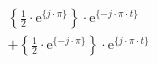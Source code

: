 \[
\begin{split}
&  \left \{ \frac{1}{2} \cdot \textrm{e}^{\{  j \cdot \pi \}} \right \} \cdot \textrm{e}^{\{- j \cdot \pi \cdot t \}}\\
&+ \left \{ \frac{1}{2} \cdot \textrm{e}^{\{ -j \cdot \pi \}} \right \} \cdot \textrm{e}^{\{  j \cdot \pi \cdot t \}}
\end{split}
\]
